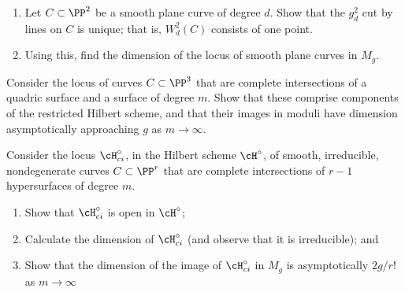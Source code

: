 \begin{exercise}\label{moduli of plane curves}
\begin{enumerate}
\item Let $C \subset \PP^2$ be a smooth plane curve of degree $d$. Show that the $g^2_d$ cut by lines on $C$ is unique; that is, $W^2_d(C)$ consists of one point.
\item Using this, find the dimension of the locus of smooth plane curves in $M_g$.
\end{enumerate}
\end{exercise}

\begin{exercise}\label{balanced CI}
Consider the locus of curves $C \subset \PP^3$ that are complete intersections of a quadric surface and a surface of degree $m$. Show that these comprise components of the restricted Hilbert scheme, and that their images in moduli have dimension asymptotically approaching $g$ as $m \to \infty$.
\end{exercise}

\begin{exercise}\label{balanced CI in higher codim}
Consider the locus $\cH^\circ_{ci}$, in the Hilbert scheme $\cH^\circ$, of smooth, irreducible, nondegenerate curves $C \subset \PP^r$ that are complete intersections of $r-1$ hypersurfaces of degree $m$. 
\begin{enumerate}
\item Show that $\cH^\circ_{ci}$ is open in $\cH^\circ$;
\item Calculate the dimension of $\cH^\circ_{ci}$ (and observe that it is irreducible); and
\item Show that the dimension of the image of $\cH^\circ_{ci}$ in $M_g$ is asymptotically $2g/r!$ as $m \to \infty$
\end{enumerate}
\end{exercise}





